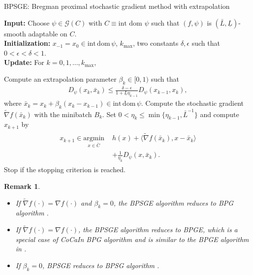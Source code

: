 \documentclass[letterpaper]{article} %
\newtheorem{remark}{Remark}
\newcommand{\red}[1]{\begin{color}{red}#1\end{color}}
\begin{document}
	\begin{algorithm}[t]
		\caption{BPSGE: Bregman proximal stochastic gradient method with extrapolation}
		\label{BPSGE}
		{\bfseries Input:}  Choose $\psi\in\mathcal{G}(C)$ with $C\equiv\text{int dom }\psi$ such that $(f,\psi)$ is $(\bar{L},\underline{L})$-smooth adaptable  on $C$.\\
		{\bfseries Initialization:} $x_{-1}=x_{0}\in\mathrm{int}\,\mathrm{dom}\,\psi$, $k_{\max}$, two constants $\delta,\epsilon$ such that $0<\epsilon<\delta<1$. \\
		{\bfseries Update:} 
		For $k=0,1,\dots,k_{\max}$,   
		\begin{algorithmic}[1]
			\STATE Compute an extrapolation parameter $\beta_{k}\in[0,1)$ such that
			\begin{eqnarray}
				D_{\psi}(x_{k},\bar{x}_{k})\le \frac{\delta-\epsilon} {1+\underline{L}\eta_{k-1}}D_{\psi}(x_{k-1},x_{k}), \label{extra_ineq}
			\end{eqnarray}
			where  $\bar{x}_{k}=x_{k}+\beta_{k}(x_{k}-x_{k-1})\in\mathrm{int}\,\mathrm{dom}\, \psi$.
			\STATE Compute the stochastic gradient $\tilde{\nabla}f(\bar{x}_{k})$ with the minibatch  $B_{k}$. 
			\STATE Set $0<\eta_{k}\le\min\{\eta_{k-1},\bar{L}^{-1}\}$ and compute $x_{k+1}$ by 
			\begin{eqnarray}
				\begin{aligned}
					x_{k+1}\in\underset{x\in\bar{C}}{\text{argmin}}\,\, &h(x)+\langle \tilde{\nabla}f(\bar{x}_{k}),x-\bar{x}_{k}\rangle\\
					&+\frac{1}{\eta_{k}}D_{\psi}(x,\bar{x}_{k}). 
				\end{aligned}\label{xk_update}
			\end{eqnarray}
			\STATE Stop if the stopping criterion is reached.
		\end{algorithmic}
	\end{algorithm}	
	
	\begin{remark}
		\begin{itemize}
			\item If $\tilde{\nabla}f(\cdot)=\nabla f(\cdot)$ and $\beta_{k}=0$, the BPSGE algorithm reduces to BPG algorithm \cite{BolteSTV18First}.
			\item If $\tilde{\nabla}f(\cdot)=\nabla f(\cdot)$, the BPSGE algorithm reduces to BPGE, which is a special case of CoCaIn BPG algorithm \cite{MukkamalaOPS20}   and is similar to the BPGE algorithm in  \cite{ZhangBM0C19}.
			\item If  $\beta_{k}=0$, BPSGE reduces to BPSG algorithm \cite{WangH23}. 
		\end{itemize}
	\end{remark}
	
\end{document}
